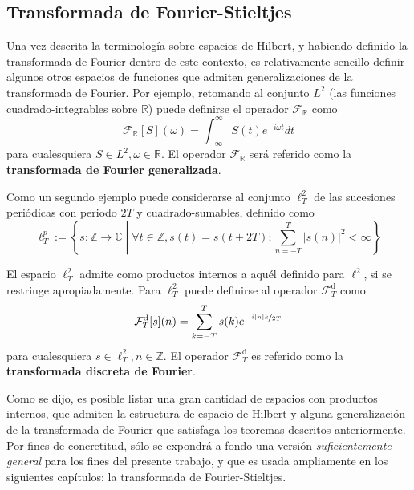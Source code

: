 \documentclass[12pt,letterpaper]{book}
\newcommand{\R}{\mathbb{R}}
\newcommand{\C}{\mathbb{C}}
\newcommand{\Z}{\mathbb{Z}}
\newcommand{\intR}{\int_{-\infty}^{\infty}}
\newcommand{\abso}[1]{\left| #1 \right|}
\newcommand{\talque}{\mathrel{}\middle|\mathrel{}}
\begin{document}

\subsection{Transformada de Fourier-Stieltjes}
\label{lazy:fourier_stieltjes}

Una vez descrita la terminología sobre espacios de Hilbert, y habiendo definido la transformada de Fourier dentro de este contexto, es relativamente sencillo definir algunos otros espacios de funciones que admiten generalizaciones de la transformada de Fourier.
%
Por ejemplo, retomando al conjunto $L^{2}$  (las funciones cuadrado-integrables sobre $\R$) puede definirse el operador $\mathcal{F}_\R$ como
\begin{equation}
\mathcal{F}_\R[S](\omega) = \intR S(t) e^{-{ i \omega t}} dt
\end{equation}
para cualesquiera $S \in L^{2}, \omega \in \R$. El operador $\mathcal{F}_\R$ será referido como la \textbf{transformada de Fourier generalizada}.

Como un segundo ejemplo puede considerarse al conjunto $\ell^{2}_T$ de las sucesiones periódicas con periodo $2T$ y cuadrado-sumables, definido como
\begin{equation}
\ell^{p}_T := \left\{ s: \Z\rightarrow\C \talque \forall t\in \Z, s(t) = s(t+2T) ; \sum_{n=-T}^{T} \abso{s(n)}^{2} < \infty \right\}
\end{equation}

El espacio $\ell^{2}_T$ admite como productos internos a aquél definido para $\ell^{2}$, si se restringe apropiadamente.
%
Para $\ell^{2}_T$ puede definirse al operador $\mathcal{F}_T^{\text{d}}$ como
\begin{equation}
\mathcal{F}_T^{\text{d}}[s](n) = \sum_{k=-T}^{T} s(k) e^{-\nicefrac{ i \abso{n} k}{2T}}
\end{equation}
para cualesquiera $s \in \ell^{2}_T, n \in \Z$. El operador $\mathcal{F}_T^{\text{d}}$ es referido como la \textbf{transformada discreta de Fourier}.

Como se dijo, es posible listar una gran cantidad de espacios con productos internos, que admiten la estructura de espacio de Hilbert y alguna generalización de la transformada de Fourier que satisfaga los teoremas descritos anteriormente.
%
Por fines de concretitud, sólo se expondrá a fondo una versión \textit{suficientemente general} para los fines del presente trabajo, y que es usada ampliamente en los siguientes capítulos: la transformada de Fourier-Stieltjes.
\end{document}
